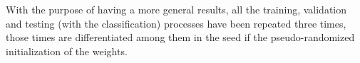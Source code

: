 With the purpose of having a more general results, all the training, validation and testing (with the classification) processes have been repeated three times, those times are differentiated among them in the seed if the pseudo-randomized initialization of the weights.\\
